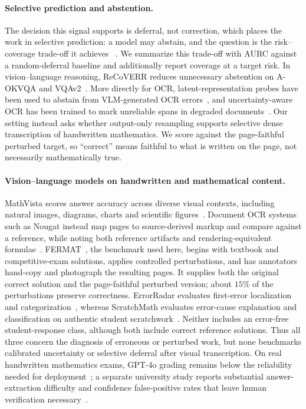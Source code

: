 \documentclass[10pt,twocolumn,letterpaper]{article}
\begin{document}
\paragraph{Selective prediction and abstention.}
The decision this signal supports is deferral, not correction, which
places the work in selective prediction: a model may abstain, and the
question is the risk--coverage trade-off it achieves~
\cite{selectiveclassification}. We summarize this trade-off with AURC
against a random-deferral baseline and additionally report coverage at a
target risk. In vision--language reasoning, ReCoVERR reduces unnecessary
abstention on A-OKVQA and VQAv2~\cite{recoverr}. More directly for OCR,
latent-representation probes have been used to abstain from VLM-generated
OCR errors~\cite{ocrabstentionprobes}, and uncertainty-aware OCR has been
trained to mark unreliable spans in degraded
documents~\cite{uncertaintyawareocr}.
Our setting instead asks whether output-only resampling supports selective
dense transcription of handwritten mathematics. We score against the
page-faithful perturbed target, so ``correct'' means faithful to what is
written on the page, not necessarily mathematically true.

\paragraph{Vision--language models on handwritten and mathematical content.}
MathVista scores answer accuracy across diverse visual contexts, including
natural images, diagrams, charts and scientific figures~\cite{mathvista}.
Document OCR systems such as Nougat instead map pages to source-derived
markup and compare against a reference, while noting both reference
artifacts and rendering-equivalent formulae~\cite{nougat}.
FERMAT~\cite{fermat}, the benchmark used here, begins with textbook and
competitive-exam solutions, applies controlled perturbations, and has
annotators hand-copy and photograph the resulting pages. It supplies both
the original correct solution and the page-faithful perturbed version;
about $15\%$ of the perturbations preserve correctness. ErrorRadar
evaluates first-error localization and categorization~\cite{errorradar},
whereas ScratchMath evaluates error-cause explanation and
classification on authentic student scratchwork~\cite{scratchmath}.
Neither includes an error-free student-response class, although both
include correct reference solutions. Thus all three concern the diagnosis
of erroneous or perturbed work, but none benchmarks calibrated uncertainty
or selective deferral after visual transcription. On real handwritten
mathematics exams, GPT-4o grading remains below the reliability needed for
deployment~\cite{gpt4handwrittengrading}; a separate university study
reports substantial answer-extraction difficulty and confidence
false-positive rates that leave human verification
necessary~\cite{asaghandwritten}.
\end{document}
